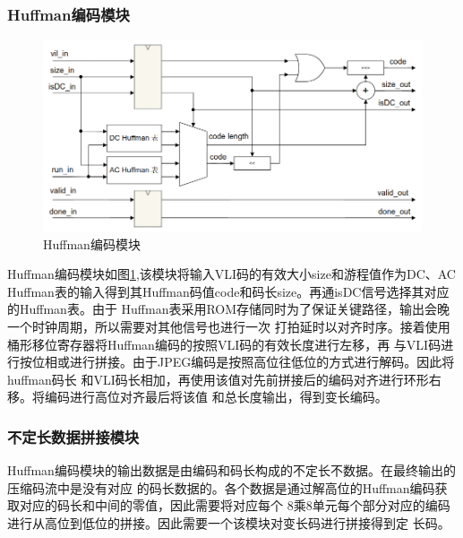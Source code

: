\documentclass{article}
\numberwithin {equation}{section}
\begin{document}
\begin{spacing}{1.25}
    \subsubsection{Huffman编码模块}
      \begin{figure}[H]
        \centering
        \includegraphics[scale=0.4]{./pictures/HuffmanCoder.png}
        \caption{Huffman编码模块}
        \label{HuffmanCoder}
      \end{figure}

      Huffman编码模块如图\ref{HuffmanCoder},该模块将输入VLI码的有效大小size和游程值作为DC、AC
      Huffman表的输入得到其Huffman码值code和码长size。再通isDC信号选择其对应的Huffman表。由于
      Huffman表采用ROM存储同时为了保证关键路径，输出会晚一个时钟周期，所以需要对其他信号也进行一次
      打拍延时以对齐时序。接着使用桶形移位寄存器将Huffman编码的按照VLI码的有效长度进行左移，再
      与VLI码进行按位相或进行拼接。由于JPEG编码是按照高位往低位的方式进行解码。因此将huffman码长
      和VLI码长相加，再使用该值对先前拼接后的编码对齐进行环形右移。将编码进行高位对齐最后将该值
      和总长度输出，得到变长编码。
     
    \subsubsection{不定长数据拼接模块}
    \vspace{1em}
      Huffman编码模块的输出数据是由编码和码长构成的不定长不数据。在最终输出的压缩码流中是没有对应
      的码长数据的。各个数据是通过解高位的Huffman编码获取对应的码长和中间的零值，因此需要将对应每个
      8乘8单元每个部分对应的编码进行从高位到低位的拼接。因此需要一个该模块对变长码进行拼接得到定
      长码。


\end{spacing}
\end{document}
